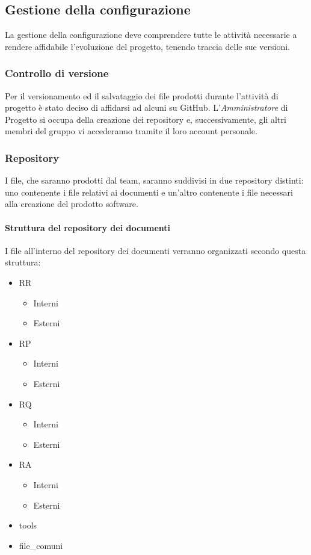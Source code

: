 \subsection{Gestione della configurazione}
La gestione della configurazione deve comprendere tutte le attività necessarie a rendere
affidabile l’evoluzione del progetto, tenendo traccia delle sue versioni.

\subsubsection{Controllo di versione}

Per il versionamento ed il salvataggio dei file prodotti durante l'attività di progetto è stato deciso di affidarsi ad alcuni  su GitHub. L'\emph{Amministratore}  di Progetto si occupa della creazione dei repository e, successivamente, gli altri membri del gruppo vi accederanno tramite il loro account personale.


\subsubsection{Repository}

I file, che saranno prodotti dal team, saranno suddivisi in due repository distinti: uno contenente i file relativi ai documenti e un'altro contenente i file necessari alla creazione del prodotto software.

\paragraph{Struttura del repository dei documenti} 
I file all’interno del repository dei documenti verranno organizzati secondo questa struttura:

\begin{itemize}
	\item RR
	\begin{itemize}
		\item Interni
		\item Esterni
	\end{itemize}
	\item RP
	\begin{itemize}
		\item Interni
		\item Esterni
	\end{itemize}
	\item RQ
	\begin{itemize}
		\item Interni
		\item Esterni
	\end{itemize}
	\item RA
	\begin{itemize}
		\item Interni
		\item Esterni
	\end{itemize}
	\item tools
	\item file\_comuni
\end{itemize}

